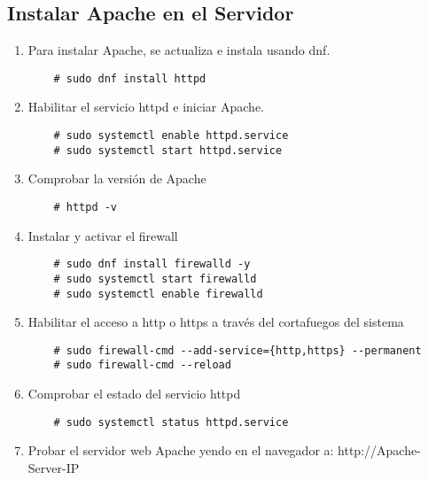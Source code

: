 \subsection{Instalar Apache en el Servidor}
\begin{enumerate}
    \item Para instalar Apache, se actualiza e instala usando dnf.
    \begin{lstlisting} 
    # sudo dnf install httpd
    \end{lstlisting}
    \item Habilitar el servicio httpd e iniciar Apache.
    \begin{lstlisting} 
    # sudo systemctl enable httpd.service
    # sudo systemctl start httpd.service
    \end{lstlisting}
    \item Comprobar la versión de Apache
    \begin{lstlisting}
    # httpd -v
    \end{lstlisting}
    \item Instalar y activar el firewall
    \begin{lstlisting}
    # sudo dnf install firewalld -y
    # sudo systemctl start firewalld
    # sudo systemctl enable firewalld
    \end{lstlisting}
    \item Habilitar el acceso a http o https a través del cortafuegos del sistema
    \begin{lstlisting}
    # sudo firewall-cmd --add-service={http,https} --permanent
    # sudo firewall-cmd --reload
    \end{lstlisting}
    \item Comprobar el estado del servicio httpd
    \begin{lstlisting}
    # sudo systemctl status httpd.service
    \end{lstlisting}
    \item Probar el servidor web Apache yendo en el navegador a: http://Apache-Server-IP
\end{enumerate}

